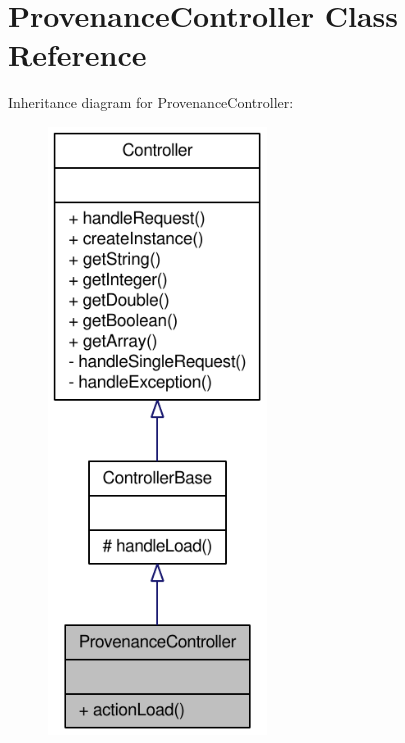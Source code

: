 \hypertarget{classProvenanceController}{
\section{ProvenanceController Class Reference}
\label{classProvenanceController}
}


Inheritance diagram for ProvenanceController:\nopagebreak
\begin{figure}[H]
\begin{center}
\leavevmode
\includegraphics[width=164pt]{classProvenanceController__inherit__graph}
\end{center}
\end{figure}


